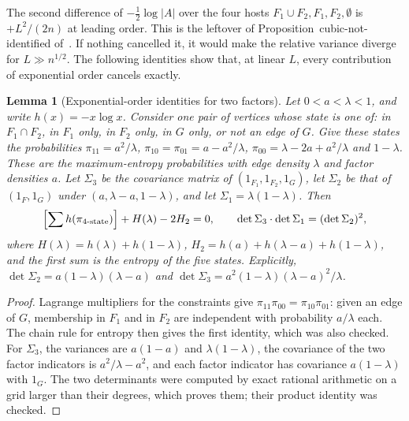 \documentclass[11pt]{article}
\newtheorem{lemma}[theorem]{Lemma}
\begin{document}
The second difference of \(-\frac12\log|A|\) over the four hosts
\(F_1\cup F_2,F_1,F_2,\emptyset\) is \(+L^2/(2n)\) at leading order.
This is the leftover of Proposition~cubic-not-identified of~\cite{PlusOneV1}.
If nothing cancelled it, it would make the relative variance diverge for
\(L\gg n^{1/2}\).
The following identities show that, at linear \(L\), every contribution of
exponential order cancels exactly.

\begin{lemma}[Exponential-order identities for two factors]
\label{lem:two-factor-identities}
Let \(0<a<\lambda<1\), and write \(h(x)=-x\log x\).
Consider one pair of vertices whose state is one of: in \(F_1\cap F_2\), in
\(F_1\) only, in \(F_2\) only, in \(G\) only, or not an edge of \(G\).
Give these states the probabilities
\(\pi_{11}=a^2/\lambda\), \(\pi_{10}=\pi_{01}=a-a^2/\lambda\),
\(\pi_{00}=\lambda-2a+a^2/\lambda\) and \(1-\lambda\).
These are the maximum-entropy probabilities with edge density \(\lambda\) and
factor densities \(a\).
Let \(\Sigma_3\) be the covariance matrix of
\((1_{F_1},1_{F_2},1_G)\), let \(\Sigma_2\) be that of \((1_F,1_G)\) under
\((a,\lambda-a,1-\lambda)\), and let \(\Sigma_1=\lambda(1-\lambda)\). Then
\[
\Bigl[\sum h(\pi_{4\text{-}\mathrm{state}})\Bigr]+H(\lambda)-2H_2=0,
\qquad
\det\Sigma_3\cdot\det\Sigma_1=(\det\Sigma_2)^2,
\]
where \(H(\lambda)=h(\lambda)+h(1-\lambda)\),
\(H_2=h(a)+h(\lambda-a)+h(1-\lambda)\), and the first sum is the entropy of
the five states.
Explicitly, \(\det\Sigma_2=a(1-\lambda)(\lambda-a)\) and
\(\det\Sigma_3=a^2(1-\lambda)(\lambda-a)^2/\lambda\).
\end{lemma}

\begin{proof}
Lagrange multipliers for the constraints give
\(\pi_{11}\pi_{00}=\pi_{10}\pi_{01}\): given an edge of \(G\), membership in
\(F_1\) and in \(F_2\) are independent with probability \(a/\lambda\) each.
The chain rule for entropy then gives the first identity, which was also
checked.
For \(\Sigma_3\), the variances are \(a(1-a)\) and \(\lambda(1-\lambda)\), the
covariance of the two factor indicators is \(a^2/\lambda-a^2\), and each
factor indicator has covariance \(a(1-\lambda)\) with \(1_G\).
The two determinants were computed by exact rational arithmetic on a grid
larger than their degrees, which proves them; their product identity was
checked.
\end{proof}
\end{document}

